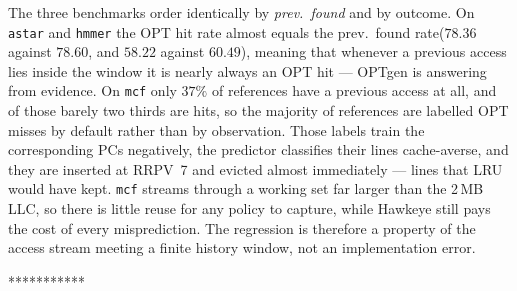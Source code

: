 \documentclass[11pt]{article}
\begin{document}
The three benchmarks order identically by \emph{prev.\ found} and by outcome. On \texttt{astar} and \texttt{hmmer} the OPT hit rate almost equals the prev.\ found rate($78.36$ against $78.60$, and $58.22$ against $60.49$), meaning that whenever a previous access lies inside the window it is nearly always an OPT hit --- OPTgen is answering from evidence. On \texttt{mcf} only $37\%$ of references have a previous access at all, and of those barely two thirds are hits, so the majority of references are labelled OPT misses by default rather than by observation. Those labels train the corresponding PCs negatively, the predictor classifies their lines cache-averse, and they are inserted at RRPV~7 and evicted almost immediately --- lines that LRU would have kept. \texttt{mcf} streams through a working set far larger than the 2\,MB LLC, so there is little reuse for any policy to capture, while Hawkeye still pays the cost of every misprediction. The regression is therefore a property of the access stream meeting a finite history window, not an implementation error.

\begin{center}
\Large ************
\end{center}
\end{document}
